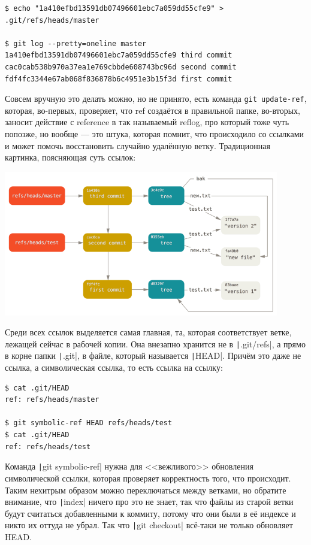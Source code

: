 \documentclass{../../text-style}
\begin{document}
\begin{verbatim}
$ echo "1a410efbd13591db07496601ebc7a059dd55cfe9" > .git/refs/heads/master

$ git log --pretty=oneline master
1a410efbd13591db07496601ebc7a059dd55cfe9 third commit
cac0cab538b970a37ea1e769cbbde608743bc96d second commit
fdf4fc3344e67ab068f836878b6c4951e3b15f3d first commit
\end{verbatim}

Совсем вручную это делать можно, но не принято, есть команда \verb|git update-ref|, которая, во-первых, проверяет, что ref создаётся в правильной папке, во-вторых, заносит действие с reference в так называемый reflog, про который тоже чуть попозже, но вообще --- это штука, которая помнит, что происходило со ссылками и может помочь восстановить случайно удалённую ветку. Традиционная картинка, поясняющая суть ссылок:

\begin{center}
    \includegraphics[width=0.9\textwidth]{gitRefs.png}
\end{center}

Среди всех ссылок выделяется самая главная, та, которая соответствует ветке, лежащей сейчас в рабочей копии. Она внезапно хранится не в \texttt|.git/refs|, а прямо в корне папки \texttt|.git|, в файле, который называется \texttt|HEAD|. Причём это даже не ссылка, а символическая ссылка, то есть ссылка на ссылку:

\begin{verbatim}
$ cat .git/HEAD
ref: refs/heads/master

$ git symbolic-ref HEAD refs/heads/test
$ cat .git/HEAD
ref: refs/heads/test
\end{verbatim}

Команда \texttt|git symbolic-ref| нужна для <<вежливого>> обновления символической ссылки, которая проверяет корректность того, что происходит. Таким нехитрым образом можно переключаться между ветками, но обратите внимание, что \texttt|index| ничего про это не знает, так что файлы из старой ветки будут считаться добавленными к коммиту, потому что они были в её индексе и никто их оттуда не убрал. Так что \texttt|git checkout| всё-таки не только обновляет HEAD.
\end{document}
